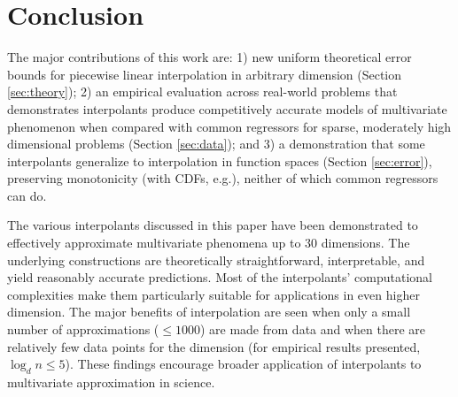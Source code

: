 \documentclass[smallextended,final]{svjour3}  %
\begin{document}
\section{Conclusion}
\label{sec:conclusion}

The major contributions of this work are: 1) new uniform theoretical
error bounds for piecewise linear interpolation in arbitrary dimension
(Section \ref{sec:theory}); 2) an empirical evaluation across
real-world problems that demonstrates interpolants produce
competitively accurate models of multivariate phenomenon when compared
with common regressors for sparse, moderately high dimensional
problems (Section \ref{sec:data}); and 3) a demonstration that some
interpolants generalize to interpolation in function spaces (Section
\ref{sec:error}), preserving monotonicity (with CDFs, e.g.), neither
of which common regressors can do.

The various interpolants discussed in this paper have been
demonstrated to effectively approximate multivariate phenomena up to
$30$ dimensions. The underlying constructions are theoretically
straightforward, interpretable, and yield reasonably accurate
predictions. Most of the interpolants' computational complexities make
them particularly suitable for applications in even higher
dimension. The major benefits of interpolation are seen when only a
small number of approximations ($\leq 1000$) are made from data and
when there are relatively few data points for the dimension (for
empirical results presented, $\log_d n \leq 5$). These findings
encourage broader application of interpolants to multivariate
approximation in science.





\newpage
\end{document}
